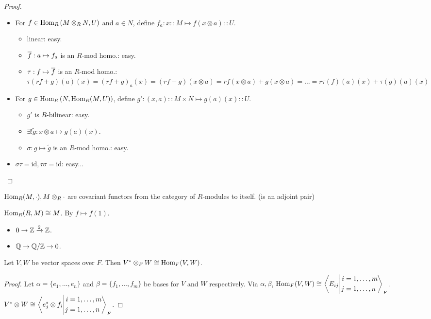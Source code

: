 \begin{proof} \mbox{}
  \begin{itemize}
    \item For $f \in \Hom_R\left(M \otimes_R N, U\right)$ and $a \in N$,
      define $f_a: x :: M \mapsto f(x \otimes a) :: U$.
      \begin{itemize}
        \item linear: easy.
        \item $\ob{f}: a \mapsto f_a$ is an $R$-mod homo.: easy.
        \item $\tau: f \mapsto \ob{f}$ is an $R$-mod homo.:
          $\tau(rf+g)(a)(x) = (rf+g)_a(x) = (rf+g)(x\otimes a)
          = rf(x\otimes a) + g(x\otimes a) = \dots
          = r\tau(f)(a)(x) + \tau(g)(a)(x)$
      \end{itemize}
    \item For $g \in \Hom_R\left(N, \Hom_R(M, U)\right)$,
      define $g': (x, a) :: M \times N \mapsto g(a)(x) :: U$.
      \begin{itemize}
        \item $g'$ is $R$-bilinear: easy.
        \item $\exists! \tilde{g}: x\otimes a \mapsto g(a)(x)$.
        \item $\sigma: g\mapsto \tilde{g}$ is an $R$-mod homo.: easy.
      \end{itemize}
    \item $\sigma \tau = \text{id}, \tau \sigma = \text{id}$: easy...
      \qedhere
  \end{itemize}
\end{proof}

\begin{exercise}
  $\Hom_R(M, \cdot), M \otimes_R \cdot$ are covariant functors from the
  category of $R$-modules to itself.
  (is an adjoint pair)
\end{exercise}

\begin{fact}
  $\Hom_R(R, M) \cong M$. By $f \mapsto f(1)$.
\end{fact}

\begin{itemize}
  \item $0 \to \Zb \xrightarrow{2} \Zb$.
  \item $\Qb \to \quot{\Qb}{\Zb} \to 0$.
\end{itemize}

Let $V, W$ be vector spaces over $F$. Then
$V^* \otimes_F W \cong \Hom_F(V, W)$.
\begin{proof}
  Let $\alpha = \{e_1, \dots, e_n\}$ and $\beta = \{f_1,\dots, f_m\}$ be
  bases for $V$ and $W$ respectively.
  Via $\alpha, \beta$, $\Hom_F(V, W) \cong
  \gen*{E_{ij} \middle|
  \begin{aligned}i &= 1,\dots,m\\j &= 1,\dots,n\end{aligned}}_F$.
  $V^* \otimes W \cong
  \gen*{e_j^* \otimes f_i \middle|
  \begin{aligned}i &= 1,\dots,m\\j &= 1,\dots,n\end{aligned}}_F$.
\end{proof}


